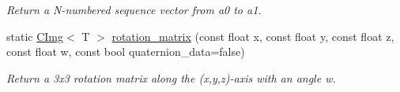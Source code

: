 \begin{DoxyCompactItemize}
\begin{DoxyCompactList}\small\item\em Return a N-\/numbered sequence vector from {\ttfamily a0} to {\ttfamily a1}. \item\end{DoxyCompactList}\item 
\hypertarget{structcimg__library_1_1CImg_a1bf68d76e4c29dde15607a212f6c1b1f}{
static \hyperlink{structcimg__library_1_1CImg}{CImg}$<$ T $>$ \hyperlink{structcimg__library_1_1CImg_a1bf68d76e4c29dde15607a212f6c1b1f}{rotation\_\-matrix} (const float x, const float y, const float z, const float w, const bool quaternion\_\-data=false)}
\label{structcimg__library_1_1CImg_a1bf68d76e4c29dde15607a212f6c1b1f}

\begin{DoxyCompactList}\small\item\em Return a 3x3 rotation matrix along the (x,y,z)-\/axis with an angle w. \item\end{DoxyCompactList}\end{DoxyCompactItemize}
